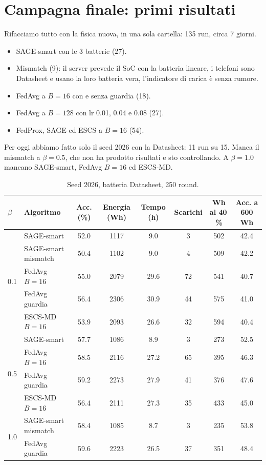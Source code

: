 \documentclass[10pt,a4paper]{article}
\begin{document}
\section{Campagna finale: primi risultati}

Rifacciamo tutto con la fisica nuova, in una sola cartella: 135 run, circa 7
giorni.
\begin{itemize}
  \item SAGE-smart con le 3 batterie (27).
  \item Mismatch (9): il server prevede il SoC con la batteria lineare, i
        telefoni sono Datasheet e usano la loro batteria vera, l'indicatore di
        carica è senza rumore.
  \item FedAvg a $B = 16$ con e senza guardia (18).
  \item FedAvg a $B = 128$ con lr 0.01, 0.04 e 0.08 (27).
  \item FedProx, SAGE ed ESCS a $B = 16$ (54).
\end{itemize}

Per oggi abbiamo fatto solo il seed 2026 con la Datasheet: 11 run su 15. Manca
il mismatch a $\beta = 0.5$, che non ha prodotto risultati e sto controllando.
A $\beta = 1.0$ mancano SAGE-smart, FedAvg $B = 16$ ed ESCS-MD.

\begin{table}[H]
  \centering\small
  \caption{Seed 2026, batteria Datasheet, 250 round.}
  \begin{tabular}{llcccccc}
    \toprule
    $\beta$ & Algoritmo & Acc. (\%) & Energia (Wh) & Tempo (h) & Scarichi & Wh al 40\,\% & Acc. a 600 Wh \\
    \midrule
    \multirow{5}{*}{0.1}
      & SAGE-smart          & 52.0 & 1117 & 9.0  & 3  & 502 & 42.4 \\
      & SAGE-smart mismatch & 50.4 & 1102 & 9.0  & 4  & 509 & 42.2 \\
      & FedAvg $B = 16$     & 55.0 & 2079 & 29.6 & 72 & 541 & 40.7 \\
      & FedAvg guardia      & 56.4 & 2306 & 30.9 & 44 & 575 & 41.0 \\
      & ESCS-MD $B = 16$    & 53.9 & 2093 & 26.6 & 32 & 594 & 40.4 \\
    \midrule
    \multirow{4}{*}{0.5}
      & SAGE-smart          & 57.7 & 1086 & 8.9  & 3  & 273 & 52.5 \\
      & FedAvg $B = 16$     & 58.5 & 2116 & 27.2 & 65 & 395 & 46.3 \\
      & FedAvg guardia      & 59.2 & 2273 & 27.9 & 41 & 376 & 47.6 \\
      & ESCS-MD $B = 16$    & 56.4 & 2111 & 27.3 & 35 & 433 & 45.0 \\
    \midrule
    \multirow{2}{*}{1.0}
      & SAGE-smart mismatch & 58.4 & 1085 & 8.7  & 3  & 235 & 53.8 \\
      & FedAvg guardia      & 59.6 & 2223 & 26.5 & 37 & 351 & 48.4 \\
    \bottomrule
  \end{tabular}
\end{table}
\end{document}
